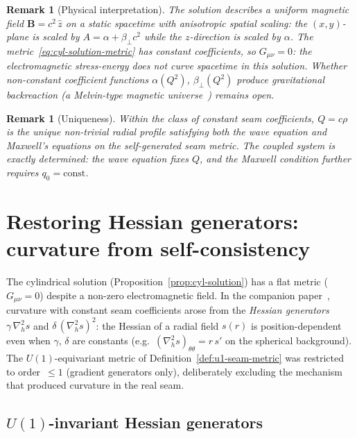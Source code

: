 \documentclass[pdflatex,sn-mathphys-num]{sn-jnl}
\theoremstyle{thmstyleone}%
\theoremstyle{thmstyletwo}%
\newtheorem{remark}[theorem]{Remark}
\theoremstyle{thmstylethree}%
\newcommand{\nn}{\nabla}
\numberwithin{equation}{section}
\begin{document}
\begin{remark}[Physical interpretation]
\label{rem:cyl-interpretation}
The solution describes a uniform magnetic field
$\mathbf{B} = c^2\,\hat{z}$ on a static spacetime with
anisotropic spatial scaling: the $(x,y)$-plane is scaled by
$A = \alpha+\beta_\perp c^2$ while the $z$-direction is scaled
by $\alpha$.  The metric~\eqref{eq:cyl-solution-metric} has
constant coefficients, so $G_{\mu\nu} = 0$: the electromagnetic
stress-energy does \emph{not} curve spacetime in this solution.
Whether non-constant coefficient functions $\alpha(Q^2)$,
$\beta_\perp(Q^2)$ produce gravitational backreaction (a
Melvin-type magnetic universe~\cite{Melvin1964}) remains open.
\end{remark}

\begin{remark}[Uniqueness]
\label{rem:cyl-uniqueness}
Within the class of constant seam coefficients,
$Q = c\rho$ is the \emph{unique} non-trivial radial profile
satisfying both the wave equation and Maxwell's equations on
the self-generated seam metric.  The coupled system is exactly
determined: the wave equation fixes $Q$, and the Maxwell
condition further requires $q_0 = \mathrm{const}$.
\end{remark}

\section{Restoring Hessian generators: curvature from
  self-consistency}
\label{sec:hessian}

The cylindrical solution
(Proposition~\ref{prop:cyl-solution}) has a flat metric
($G_{\mu\nu} = 0$) despite a non-zero electromagnetic field.
In the companion paper~\cite{seam1}, curvature with constant
seam coefficients arose from the
\emph{Hessian generators} $\gamma\,\nn^2_h s$ and
$\delta\,(\nn^2_h s)^2$: the Hessian of a radial field $s(r)$
is position-dependent even when $\gamma,\,\delta$ are constants
(e.g.\ $(\nn^2_h s)_{\theta\theta} = r\,s'$ on the spherical
background).  The $U(1)$-equivariant metric of
Definition~\ref{def:u1-seam-metric} was restricted to
order~$\le 1$ (gradient generators only), deliberately
excluding the mechanism that produced curvature in the real
seam.

\subsection{\texorpdfstring{$U(1)$}{U(1)}-invariant Hessian generators}
\end{document}
